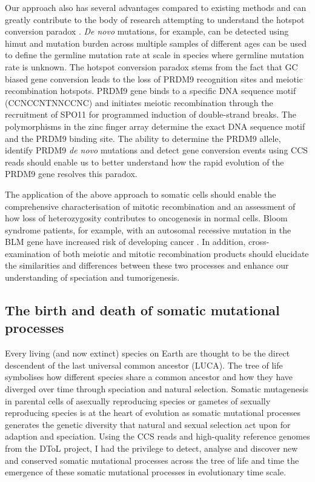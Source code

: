 Our approach also has several advantages compared to existing methods and can greatly contribute to the body of research attempting to understand the hotspot conversion paradox \cite{Boulton1997-do}. \textit{De novo} mutations, for example, can be detected using himut and mutation burden across multiple samples of different ages can be used to define the germline mutation rate at scale in species where germline mutation rate is unknown. The hotspot conversion paradox stems from the fact that GC biased gene conversion leads to the loss of PRDM9 recognition sites and meiotic recombination hotspots. PRDM9 gene binds to a specific DNA sequence motif (CCNCCNTNNCCNC) \cite{Myers2008-st} and initiates meiotic recombination through the recruitment of SPO11 for programmed induction of double-strand breaks. The polymorphisms in the zinc finger array determine the exact DNA sequence motif and the PRDM9 binding site. The ability to determine the PRDM9 allele, identify PRDM9 \textit{de novo} mutations and detect gene conversion events using CCS reads should enable us to better understand how the rapid evolution of the PRDM9 gene resolves this paradox. 

The application of the above approach to somatic cells should enable the comprehensive characterisation of mitotic recombination and an assessment of how loss of heterozygosity contributes to oncogenesis in normal cells. Bloom syndrome patients, for example, with an autosomal recessive mutation in the BLM gene have increased risk of developing cancer \cite{Gruber2002-ck}. In addition, cross-examination of both meiotic and mitotic recombination products should elucidate the similarities and differences between these two processes and enhance our understanding of speciation and tumorigenesis. 

\subsection{The birth and death of somatic mutational processes}

Every living (and now extinct) species on Earth are thought to be the direct descendent of the last universal common ancestor (LUCA). The tree of life symbolises how different species share a common ancestor and how they have diverged over time through speciation and natural selection. Somatic mutagenesis in parental cells of asexually reproducing species or gametes of sexually reproducing species is at the heart of evolution as somatic mutational processes generates the genetic diversity that natural and sexual selection act upon for adaption and speciation. Using the CCS reads and high-quality reference genomes from the DToL project, I had the privilege to detect, analyse and discover new and conserved somatic mutational processes across the tree of life and time the emergence of these somatic mutational processes in evolutionary time scale. 

